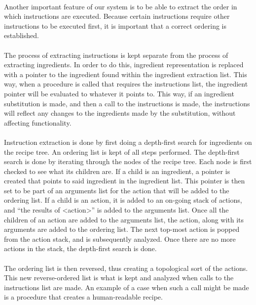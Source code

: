 \paragraph{}
Another important feature of our system is to be able to extract the order in which instructions are executed. Because certain instructions require other instructions to be executed first, it is important that a correct ordering is established.

\paragraph{}
The process of extracting instructions is kept separate from the process of extracting ingredients. In order to do this, ingredient representation is replaced with a pointer to the ingredient found within the ingredient extraction list. This way, when a procedure is called that requires the instructions list, the ingredient pointer will be evaluated to whatever it points to. This way, if an ingredient substitution is made, and then a call to the instructions is made, the instructions will reflect any changes to the ingredients made by the substitution, without affecting functionality.

\paragraph{}
Instruction extraction is done by first doing a depth-first search for ingredients on the recipe tree. An ordering list is kept of all steps performed. The depth-first search is done by iterating through the nodes of the recipe tree. Each node is first checked to see what its children are. If a child is an ingredient, a pointer is created that points to said ingredient in the ingredient list. This pointer is then set to be part of an arguments list for the action that will be added to the ordering list. If a child is an action, it is added to an on-going stack of actions, and ``the results of <action>'' is added to the arguments list. Once all the children of an action are added to the arguments list, the action, along with its arguments are added to the ordering list. The next top-most action is popped from the action stack, and is subsequently analyzed. Once there are no more actions in the stack, the depth-first search is done.

\paragraph{}
The ordering list is then reversed, thus creating a topological sort of the actions. This new reverse-ordered list is what is kept and analyzed when calls to the instructions list are made. An example of a case when such a call might be made is a procedure that creates a human-readable recipe.













